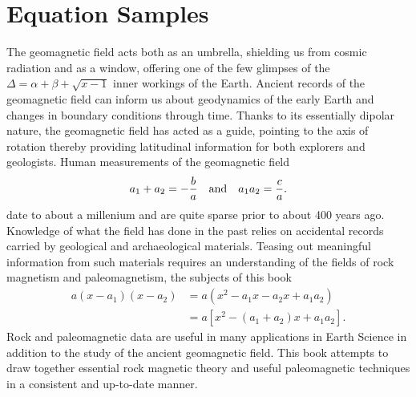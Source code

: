 \documentclass[draft,plain]{tauxe}
\begin{document}
\section*{Equation Samples}

The geomagnetic field acts both as an umbrella, shielding us from cosmic radiation and as a window,
offering one of the few glimpses of the$\Delta=\alpha+\beta+\sqrt{x-1}$ inner workings of the Earth. Ancient records of the
geomagnetic field can inform us about geodynamics of the early Earth and changes in boundary
conditions through time. Thanks to its essentially dipolar nature, the geomagnetic field has acted as
a guide, pointing to the axis of rotation thereby providing latitudinal information for both explorers
and geologists. Human measurements of the geomagnetic field
\begin{equation}%
a_1+a_2=-\frac{b}{a} \quad {\rm and} \quad a_1a_2=\frac{c}{a}.
\end{equation}
date to about a millenium and are
quite sparse prior to about 400 years ago. Knowledge of what the field has done in the past relies
on accidental records carried by geological and archaeological materials. Teasing out meaningful
information from such materials requires an understanding of the fields of rock magnetism and paleomagnetism,
the subjects of this book
\begin{eqnarray}%
a(x-a_1)(x-a_2)&=a(x^2-a_1x-a_2x+a_1a_2)\\
&=a[x^2-(a_1+a_2)x+a_1a_2].
\end{eqnarray}
Rock and paleomagnetic data are useful in many applications
in Earth Science in addition to the study of the ancient geomagnetic field. This book attempts
to draw together essential rock magnetic theory and useful paleomagnetic techniques in a consistent
and up-to-date manner.
\end{document}

